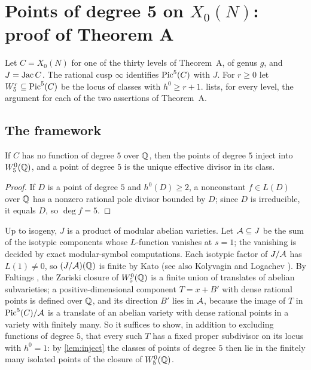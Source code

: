 \section{Points of degree 5 on \texorpdfstring{$X_0(N)$}{X0(N)}: proof of Theorem A}\label{sec:quintic-x0}

Let $C=X_0(N)$ for one of the thirty levels of Theorem~A, of genus $g$, and $J=\operatorname{Jac} C$. The rational cusp
$\infty$ identifies $\operatorname{Pic}^5(C)$ with $J$. For $r\ge0$ let $W^r_5\subseteq\operatorname{Pic}^5(C)$ be the locus of classes
with $h^0\ge r+1$.  lists, for every level, the argument for each of the two assertions of
Theorem~A.

\subsection{The framework}
\begin{lemma}\label{lem:inject}
If $C$ has no function of degree $5$ over $\mathbb{Q}$, then the points of degree $5$ inject into $W^0_5(\mathbb{Q})$, and a
point of degree $5$ is the unique effective divisor in its class.
\end{lemma}
\begin{proof}
If $D$ is a point of degree $5$ and $h^0(D)\ge2$, a nonconstant $f\in L(D)$ over $\mathbb{Q}$ has a nonzero rational
pole divisor bounded by $D$; since $D$ is irreducible, it equals $D$, so $\deg f=5$.
\end{proof}

Up to isogeny, $J$ is a product of modular abelian varieties. Let $\mathcal{A}\subseteq J$ be the sum of the isotypic
components whose $L$-function vanishes at $s=1$; the vanishing is decided by exact modular-symbol
computations. Each isotypic factor of $J/\mathcal{A}$ has $L(1)\ne0$, so $(J/\mathcal{A})(\mathbb{Q})$ is finite by Kato
\cite[Corollary~14.3]{Kato2004} (see also Kolyvagin and Logachev \cite{KolyvaginLogachev1989}). By Faltings
\cite{Faltings1991}, the Zariski closure of $W^0_5(\mathbb{Q})$ is a finite union of translates of abelian subvarieties;
a positive-dimensional component $T=x+B'$ with dense rational points is defined over $\mathbb{Q}$, and its direction
$B'$ lies in $\mathcal{A}$, because the image of $T$ in $\operatorname{Pic}^5(C)/\mathcal{A}$ is a translate of an abelian variety with dense
rational points in a variety with finitely many. So it suffices to show, in addition to excluding functions of
degree $5$, that every such $T$ has a fixed proper subdivisor on its locus with $h^0=1$: by \cref{lem:inject}
the classes of points of degree $5$ then lie in the finitely many isolated points of the closure of $W^0_5(\mathbb{Q})$.

